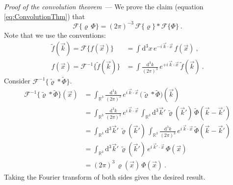 \documentclass[10pt]{article}
\renewcommand{\paragraph}[1]{\par\addvspace{1em}\noindent\textsl{#1}~---}
\renewcommand{\d}{\mathrm{d}}
\begin{document}
\paragraph{Proof of the convolution theorem} We prove the claim (equation \eqref{eq:ConvolutionThm}) that
\begin{equation}
    \mathcal{F}\{\varrho \, \Phi\}
    = (2\pi)^{-3} \, \mathcal{F}\{\varrho\} \ast \mathcal{F}\{\Phi\} ~.
\end{equation}
Note that we use the conventions:
\begin{align}
    \tilde{f}(\vec{k})
    = \mathcal{F}\{f(\vec{x})\}
    &= \int \d^3 x
        \, e^{-i \, \vec{k} \cdot \vec{x}}
        \, f(\vec{x})~, \\
    f(\vec{x})
    = \mathcal{F}^{-1}\{\tilde{f}(\vec{k})\}
    &= \int \frac{\d^3 k}{(2\pi)^3}
        \, e^{+i \, \vec{k} \cdot \vec{x}}
        \, \tilde{f}(\vec{k})~.
\end{align}
Consider $\mathcal{F}^{-1}\{\tilde{\varrho} \ast \tilde{\Phi}\}$. 
\begin{align}
    \mathcal{F}^{-1}\{\tilde{\varrho} \ast \tilde{\Phi}\}(\vec{x})
    &= \int_{\mathbb{R}^3} \frac{\d^3 k}{(2\pi)^3}
        \, e^{i \, \vec{k} \cdot \vec{x}} 
        \, \big( \tilde{\varrho} \ast \tilde{\Phi} \big) (\vec{k}) 
        \nonumber\\
    &= \int_{\mathbb{R}^3} \frac{\d^3 k}{(2\pi)^3}
        \, e^{i \, \vec{k} \cdot \vec{x}} 
        \, \int_{\mathbb{R}^3} \d^3 \vec{k}' 
        \, \tilde{\varrho}(\vec{k}') 
        \, \tilde{\Phi}(\vec{k} - \vec{k}')
        \nonumber\\
    &= \int_{\mathbb{R}^3} \d^3 \vec{k}'
        \, \tilde{\varrho}(\vec{k}') 
        \, \int_{\mathbb{R}^3} \frac{\d^3 k}{(2\pi)^3}
        \, e^{i \, \vec{k} \cdot \vec{x}} 
        \, \tilde{\Phi}(\vec{k} - \vec{k}')
        \nonumber\\
    &= \int_{\mathbb{R}^3} \d^3 \vec{k}'
        \, \tilde{\varrho}(\vec{k}') 
        \, e^{i \, \vec{k}' \cdot \vec{x}}
        \, \Phi(\vec{x})
        \nonumber\\
    &= (2\pi)^3
        \, \varrho(\vec{x}) 
        \, \Phi(\vec{x})~.
\end{align}
Taking the Fourier transform of both sides gives the desired result.
\end{document}
